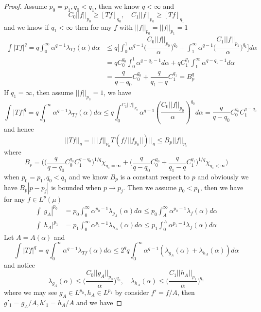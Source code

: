 \documentclass[lang=en, color=blue, ]{elegantbook}
\newcommand{\dstrb}[1]{\lambda_{#1}}
\begin{document}
\begin{proof}\par
    Assume $p_0 = p_1,q_0 < q_1$, then we know $q<\infty$ and
    \[C_0||f||_{p_0} \geq [Tf]_{q_0},\quad C_1||f||_{p_0}\geq [Tf]_{q_1}\]
    and we know if $q_1 < \infty$ then for any $f$ with $||f||_{p_0} = ||f||_{p_1} = 1$
    \[
    \begin{aligned}
    \int |Tf|^q = q\int_0^{\infty} \alpha^{q-1}\dstrb{Tf}(\alpha)d\alpha &\leq q\Big[\int_0^1 \alpha^{q-1}\Big(\dfrac{C_0||f||_{p_0}}{\alpha})^{q_0}+\int_1^{\infty} \alpha^{q-1}\Big(\dfrac{C_1||f||_{p_1}}{\alpha})^{q_1}\Big] d\alpha\\
    &= qC_0^{q_0} \int_0^1 \alpha^{q-q_0-1}d\alpha + qC_1^{q_1} \int_1^{\infty} \alpha^{q-q_1-1}d\alpha \\
    & = \dfrac{q}{q-q_0}C_0^{q_0} + \dfrac{q}{q_1-q}C_1^{q_1} = B_p^{q}
    \end{aligned}
    \]
    If $q_1 = \infty$, then assume $||f||_{p_0} = 1$, we have
    \[
        \int |Tf|^q = q\int_0^{\infty} \alpha^{q-1}\dstrb{Tf}(\alpha)d\alpha \leq q\int_0^{C_1||f||_{p_0}} \alpha^{q-1}(\dfrac{C_0||f||_{p_0}}{\alpha})^{q_0}d\alpha = \dfrac{q}{q-q_0}C_0^{q_0}C_1^{q-q_0}
    \]
    and hence
    \[
    ||Tf||_q = ||||f||_{p_0} T(f/||f_{p_0}||)||_q \leq  B_p||f||_{p_0}
    \]
    where
    \[B_p = \Big(\Big(\dfrac{q}{q-q_0}C_0^{q_0}C_1^{q-q_0}\Big)^{1/q}\chi_{q_1 = \infty} +  \Big(\dfrac{q}{q-q_0}C_0^{q_0} + \dfrac{q}{q_1-q}C_1^{q_1}\Big)^{1/q}\chi_{q_1 < \infty}\Big)\]
    when $p_0 = p_1, q_0 < q_1$ and we know $B_p$ is a constant respect to $p$ and obviously we have $B_p|p-p_j|$ is bounded when $p\to p_j$. Then we assume $p_0<p_1$, then we have for any $f\in L^p(\mu)$
    \[
    \begin{aligned}
        \int |g_A|^{p_0} &= p_0\int_0^{\infty} \alpha^{p_0-1}\dstrb{g_A}(\alpha)d\alpha \leq p_0 \int_A^{\infty}\alpha^{p_0-1}\dstrb{f}(\alpha)d\alpha\\
        \int |h_A|^{p_1} &= p_1\int_0^{\infty} \alpha^{p_1-1}\dstrb{h_A}(\alpha)d\alpha \leq p_1\int_0^A \alpha^{p_1-1}\dstrb{f}(\alpha)d\alpha
    \end{aligned}
    \]
    Let $A = A(\alpha)$ and
    \[
    \int |Tf|^q = q \int_0^{\infty} \alpha^{q-1}\dstrb{Tf}(\alpha) d\alpha \leq 2^qq\int_0^{\infty}\alpha^{q-1}(\dstrb{g_A}(\alpha)+\dstrb{h_A}(\alpha))d\alpha
    \]
    and notice
    \[
        \dstrb{g_A}(\alpha) \leq \Big(\dfrac{C_0||g_A||_{p_0}}{\alpha}\Big)^{q_0},\quad \dstrb{h_A}(\alpha) \leq \Big(\dfrac{C_1||h_A||_{p_1}}{\alpha}\Big)^{q_1}
    \]
    where we may see $g_A \in L^{p_0}, h_A \in L^{p_1}$ by consider $f' = f/A$, then $g'_1 = g_A/A, h'_1 = h_A/A$ and we have

\end{proof}
\end{document}
